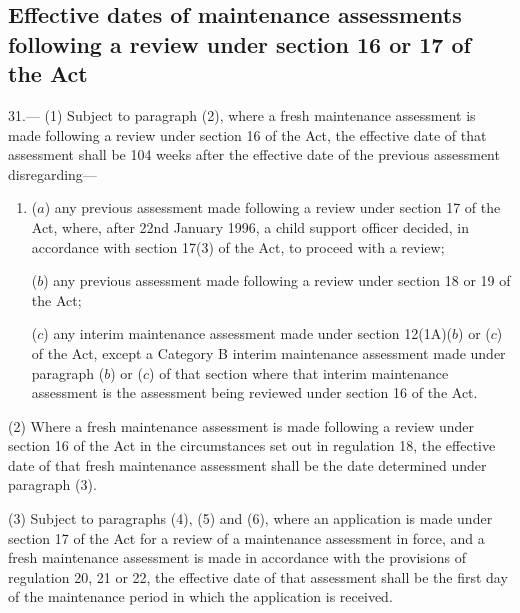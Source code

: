 \documentclass[a4paper]{article}
\begin{document}
\subsection[31. Effective dates of maintenance assessments following a review under section 16 or 17 of the Act]{Effective dates of maintenance assessments following a review under section 16 or 17 of the Act}

31.—%
%
(1) Subject to paragraph (2), where a fresh maintenance assessment is made following a review under section 16 of the Act, the effective date of that assessment shall be 104 weeks after the effective date of the previous assessment disregarding—
\begin{enumerate}\item[]
($a$) any previous assessment made following a review under section 17 of the Act, where, after 22nd January 1996, a child support officer decided, in accordance with section 17(3) of the Act, to proceed with a review;

($b$) any previous assessment made following a review under section 18 or 19 of the Act;

($c$) any interim maintenance assessment made under section 12(1A)($b$) or ($c$) of the Act, except a Category B interim maintenance assessment made under paragraph ($b$) or ($c$) of that section where that interim maintenance assessment is the assessment being reviewed under section 16 of the Act.
\end{enumerate}

(2) Where a fresh maintenance assessment is made following a review under section 16 of the Act in the circumstances set out in regulation 18, the effective date of that fresh maintenance assessment shall be the date determined under paragraph (3).

(3) Subject to paragraphs (4), (5) and (6), where an application is made under section 17 of the Act for a review of a maintenance assessment in force, and a fresh maintenance assessment is made in accordance with the provisions of regulation 20, 21 or 22, the effective date of that assessment shall be the first day of the maintenance period in which the application is received.
\end{document}
